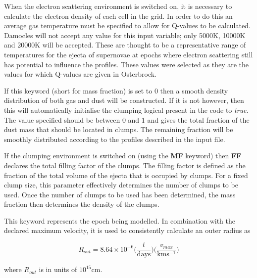 
 When the electron scattering environment is switched on, it is necessary to calculate the electron density of each cell in the grid.  In order to do this an average gas temperature must be specified to allow for Q-values to be calculated.  Damocles will not accept any value for this input variable; only 5000K, 10000K and 20000K will be accepted.  These are thought to be a representative range of temperatures for the ejecta of supernovae at epochs where electron scattering still has potential to influence the profiles.  These values were selected as they are the values for which Q-values are given in Osterbrock.  %



 If this keyword (short for mass fraction) is set to 0 then a smooth density distribution of both gas and dust will be constructed.   If it is not however, then this will automatically initialise the clumping logical present in the code to \textit{true}.  The value specified should be between 0 and 1 and gives the total fraction of the dust mass that should be located in clumps.  The remaining fraction will be smoothly distributed according to the profiles described in the input file.


 If the clumping environment is switched on (using the \textbf{MF} keyword) then \textbf{FF} declares the total filling factor of the clumps.  The filling factor is defined as the fraction of the total volume of the ejecta that is occupied by clumps.  For a fixed clump size, this parameter effectively determines the number of clumps to be used.  Once the number of clumps to be used has been determined, the mass fraction then determines the density of the clumps.
 

  This keyword represents the epoch being modelled.  In combination with the declared maximum velocity, it is used to consistently calculate an outer radius as 

\begin{equation}
R_{out}=8.64 \times 10^{-6} \Big( \frac{t}{\mathrm{days}} \Big) \Big( \frac{v_{max}}{\mathrm{kms^{-1}}} \Big)
\label{eqn:Rout_calcn}
\end{equation}

\noindent where $R_{out}$ is in units of $10^{15}$cm.


